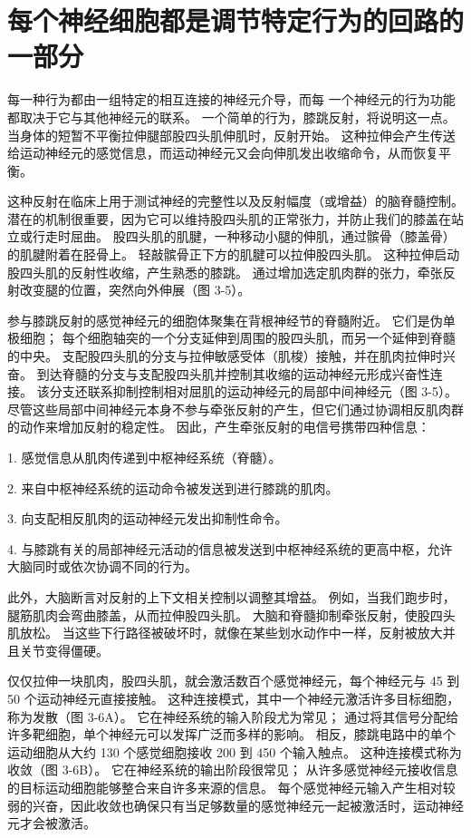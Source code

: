 \section{每个神经细胞都是调节特定行为的回路的一部分}
每一种行为都由一组特定的相互连接的神经元介导，而每
一个神经元的行为功能都取决于它与其他神经元的联系。 一个简单的行为，膝跳反射，将说明这一点。 
当身体的短暂不平衡拉伸腿部股四头肌伸肌时，反射开始。 
这种拉伸会产生传送给运动神经元的感觉信息，而运动神经元又会向伸肌发出收缩命令，从而恢复平衡。


这种反射在临床上用于测试神经的完整性以及反射幅度（或增益）的脑脊髓控制。 
潜在的机制很重要，因为它可以维持股四头肌的正常张力，并防止我们的膝盖在站立或行走时屈曲。 
股四头肌的肌腱，一种移动小腿的伸肌，通过髌骨（膝盖骨）的肌腱附着在胫骨上。 
轻敲髌骨正下方的肌腱可以拉伸股四头肌。 
这种拉伸启动股四头肌的反射性收缩，产生熟悉的膝跳。 
通过增加选定肌肉群的张力，牵张反射改变腿的位置，突然向外伸展（图 3-5）。


参与膝跳反射的感觉神经元的细胞体聚集在背根神经节的脊髓附近。 
它们是伪单极细胞； 每个细胞轴突的一个分支延伸到周围的股四头肌，而另一个延伸到脊髓的中央。 
支配股四头肌的分支与拉伸敏感受体（肌梭）接触，并在肌肉拉伸时兴奋。 
到达脊髓的分支与支配股四头肌并控制其收缩的运动神经元形成兴奋性连接。 
该分支还联系抑制控制相对屈肌的运动神经元的局部中间神经元（图 3-5）。 
尽管这些局部中间神经元本身不参与牵张反射的产生，但它们通过协调相反肌肉群的动作来增加反射的稳定性。 
因此，产生牵张反射的电信号携带四种信息：

1. 感觉信息从肌肉传递到中枢神经系统（脊髓）。

2. 来自中枢神经系统的运动命令被发送到进行膝跳的肌肉。

3. 向支配相反肌肉的运动神经元发出抑制性命令。

4. 与膝跳有关的局部神经元活动的信息被发送到中枢神经系统的更高中枢，允许大脑同时或依次协调不同的行为。

此外，大脑断言对反射的上下文相关控制以调整其增益。 
例如，当我们跑步时，腿筋肌肉会弯曲膝盖，从而拉伸股四头肌。 
大脑和脊髓抑制牵张反射，使股四头肌放松。 
当这些下行路径被破坏时，就像在某些划水动作中一样，反射被放大并且关节变得僵硬。


仅仅拉伸一块肌肉，股四头肌，就会激活数百个感觉神经元，每个神经元与 45 到 50 个运动神经元直接接触。 
这种连接模式，其中一个神经元激活许多目标细胞，称为发散（图 3-6A）。 
它在神经系统的输入阶段尤为常见； 通过将其信号分配给许多靶细胞，单个神经元可以发挥广泛而多样的影响。 
相反，膝跳电路中的单个运动细胞从大约 130 个感觉细胞接收 200 到 450 个输入触点。 
这种连接模式称为收敛（图 3-6B）。 
它在神经系统的输出阶段很常见； 从许多感觉神经元接收信息的目标运动细胞能够整合来自许多来源的信息。 
每个感觉神经元输入产生相对较弱的兴奋，因此收敛也确保只有当足够数量的感觉神经元一起被激活时，运动神经元才会被激活。


